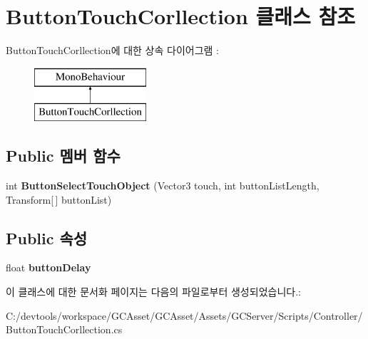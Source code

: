 \hypertarget{class_button_touch_corllection}{}\section{Button\+Touch\+Corllection 클래스 참조}
\label{class_button_touch_corllection}
Button\+Touch\+Corllection에 대한 상속 다이어그램 \+: \begin{figure}[H]
\begin{center}
\leavevmode
\includegraphics[height=2.000000cm]{class_button_touch_corllection}
\end{center}
\end{figure}
\subsection*{Public 멤버 함수}
\begin{DoxyCompactItemize}
\item 
\hypertarget{class_button_touch_corllection_a309daaca676db6f66b9a1244c2fdeca4}{}int {\bfseries Button\+Select\+Touch\+Object} (Vector3 touch, int button\+List\+Length, Transform\mbox{[}$\,$\mbox{]} button\+List)\label{class_button_touch_corllection_a309daaca676db6f66b9a1244c2fdeca4}

\end{DoxyCompactItemize}
\subsection*{Public 속성}
\begin{DoxyCompactItemize}
\item 
\hypertarget{class_button_touch_corllection_a37a3646652283d963d1e40e2433f4de7}{}float {\bfseries button\+Delay}\label{class_button_touch_corllection_a37a3646652283d963d1e40e2433f4de7}

\end{DoxyCompactItemize}


이 클래스에 대한 문서화 페이지는 다음의 파일로부터 생성되었습니다.\+:\begin{DoxyCompactItemize}
\item 
C\+:/devtools/workspace/\+G\+C\+Asset/\+G\+C\+Asset/\+Assets/\+G\+C\+Server/\+Scripts/\+Controller/Button\+Touch\+Corllection.\+cs\end{DoxyCompactItemize}
